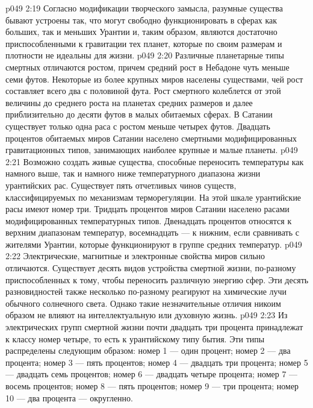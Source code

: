 \vs p049 2:19 \pc {}\bibnobreakspace {} Согласно модификации творческого замысла, разумные существа бывают устроены так, что могут свободно функционировать в сферах как больших, так и меньших Урантии и, таким образом, являются достаточно приспособленными к гравитации тех планет, которые по своим размерам и плотности не идеальны для жизни.
\vs p049 2:20 Различные планетарные типы смертных отличаются ростом, причем средний рост в Небадоне чуть меньше семи футов. Некоторые из более крупных миров населены существами, чей рост составляет всего два с половиной фута. Рост смертного колеблется от этой величины до среднего роста на планетах средних размеров и далее приблизительно до десяти футов в малых обитаемых сферах. В Сатании существует только одна раса с ростом меньше четырех футов. Двадцать процентов обитаемых миров Сатании населено смертными модифицированных гравитационных типов, занимающих наиболее крупные и малые планеты.
\vs p049 2:21 \pc {}\bibnobreakspace {} Возможно создать живые существа, способные переносить температуры как намного выше, так и намного ниже температурного диапазона жизни урантийских рас. Существует пять отчетливых чинов существ, классифицируемых по механизмам терморегуляции. На этой шкале урантийские расы имеют номер три. Тридцать процентов миров Сатании населено расами модифицированных температурных типов. Двенадцать процентов относятся к верхним диапазонам температур, восемнадцать --- к нижним, если сравнивать с жителями Урантии, которые функционируют в группе средних температур.
\vs p049 2:22 \pc {}\bibnobreakspace {} Электрические, магнитные и электронные свойства миров сильно отличаются. Существует десять видов устройства смертной жизни, по\hyp{}разному приспособленных к тому, чтобы переносить различную энергию сфер. Эти десять разновидностей также несколько по\hyp{}разному реагируют на химические лучи обычного солнечного света. Однако такие незначительные отличия никоим образом не влияют на интеллектуальную или духовную жизнь.
\vs p049 2:23 Из электрических групп смертной жизни почти двадцать три процента принадлежат к классу номер четыре, то есть к урантийскому типу бытия. Эти типы распределены следующим образом: номер 1 --- один процент; номер 2 --- два процента; номер 3 --- пять процентов; номер 4 --- двадцать три процента; номер 5 --- двадцать семь процентов; номер 6 --- двадцать четыре процента; номер 7 --- восемь процентов; номер 8 --- пять процентов; номер 9 --- три процента; номер 10 --- два процента --- округленно.
